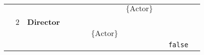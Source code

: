 \begin{table}[]
\begin{tabular}{lllllllllll}
                          &                           &                   &                                                               &                                                                                                                 &                           &                                                             & \cellcolor[HTML]{FC8D59}$\{\text{Actor}\}$                                 &                                                                                          &                                        &                                                                                                                 \\
                          & \cellcolor[HTML]{FC8D59}2 & \textbf{Director} &                                                               &                                                                                                                 &                           &                                                             &                                                                            &                                                                                          &                                        &                                                                                                                 \\
                          &                           &                   &                                                               &                                                                                                                 &                           & \cellcolor[HTML]{FC8D59}$\{\text{Actor}\}$                  &                                                                            &                                                                                          &                                        &                                                                                                                 \\
                          &                           &                   &                                                               &                                                                                                                 &                           &                                                             &                                                                            &                                                                                          & \cellcolor[HTML]{FC8D59}\texttt{false} &                                                                                                                 \\

\end{tabular}
\end{table}
